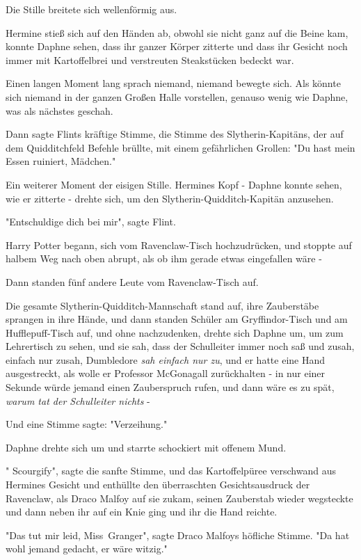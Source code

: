 {Die Stille breitete sich wellenförmig aus.

Hermine stieß sich auf den Händen ab, obwohl sie nicht ganz auf die Beine kam, konnte Daphne sehen, dass ihr ganzer Körper zitterte und dass ihr Gesicht noch immer mit Kartoffelbrei und verstreuten Steakstücken bedeckt war.

Einen langen Moment lang sprach niemand, niemand bewegte sich. Als könnte sich niemand in der ganzen Großen Halle vorstellen, genauso wenig wie Daphne, was als nächstes geschah.

Dann sagte Flints kräftige Stimme, die Stimme des Slytherin-Kapitäns, der auf dem Quidditchfeld Befehle brüllte, mit einem gefährlichen Grollen: "Du hast mein Essen ruiniert, Mädchen."

Ein weiterer Moment der eisigen Stille. Hermines Kopf - Daphne konnte sehen, wie er zitterte - drehte sich, um den Slytherin-Quidditch-Kapitän anzusehen.

"Entschuldige dich bei mir", sagte Flint.

Harry Potter begann, sich vom Ravenclaw-Tisch hochzudrücken, und stoppte auf halbem Weg nach oben abrupt, als ob ihm gerade etwas eingefallen wäre -

Dann standen fünf andere Leute vom Ravenclaw-Tisch auf.

Die gesamte Slytherin-Quidditch-Mannschaft stand auf, ihre Zauberstäbe sprangen in ihre Hände, und dann standen Schüler am Gryffindor-Tisch und am Hufflepuff-Tisch auf, und ohne nachzudenken, drehte sich Daphne um, um zum Lehrertisch zu sehen, und sie sah, dass der Schulleiter immer noch saß und zusah, einfach nur zusah, Dumbledore \emph{sah einfach nur zu}, und er hatte eine Hand ausgestreckt, als wolle er Professor McGonagall zurückhalten - in nur einer Sekunde würde jemand einen Zauberspruch rufen, und dann wäre es zu spät, \emph{warum tat der Schulleiter nichts} -

Und eine Stimme sagte: "Verzeihung."

Daphne drehte sich um und starrte schockiert mit offenem Mund.

" Scourgify", sagte die sanfte Stimme, und das Kartoffelpüree verschwand aus Hermines Gesicht und enthüllte den überraschten Gesichtsausdruck der Ravenclaw, als Draco Malfoy auf sie zukam, seinen Zauberstab wieder wegsteckte und dann neben ihr auf ein Knie ging und ihr die Hand reichte.

"Das tut mir leid, Miss~Granger", sagte Draco Malfoys höfliche Stimme. "Da hat wohl jemand gedacht, er wäre witzig."

}
